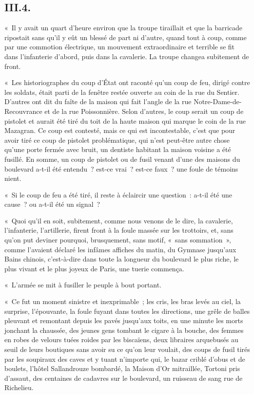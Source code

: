 \documentclass[french,twoside]{book} %
\begin{document}
\subsection[{III.4.}]{III.4.}
\noindent « Il y avait un quart d’heure environ que la troupe tiraillait et que la barricade ripostait sans qu’il y eût un blessé de part ni d’autre, quand tout à coup, comme par une commotion électrique, un mouvement extraordinaire et terrible se fit dans l’infanterie d’abord, puis dans la cavalerie. La troupe changea subitement de front.\par
« Les historiographes du coup d’État ont raconté qu’un coup de feu, dirigé contre les soldats, était parti de la fenêtre restée ouverte au coin de la rue du Sentier. D’autres ont dit du faîte de la maison qui fait l’angle de la rue Notre-Dame-de-Recouvrance et de la rue Poissonnière. Selon d’autres, le coup serait un coup de pistolet et aurait été tiré du toit de la haute maison qui marque le coin de la rue Mazagran. Ce coup est contesté, mais ce qui est incontestable, c’est que pour avoir tiré ce coup de pistolet problématique, qui n’est peut-être autre chose qu’une porte fermée avec bruit, un dentiste habitant la maison voisine a été fusillé. En somme, un coup de pistolet ou de fusil venant d’une des maisons du boulevard a-t-il été entendu ? est-ce vrai ? est-ce faux ? une foule de témoins nient.\par
« Si le coup de feu a été tiré, il reste à éclaircir une question : a-t-il été une cause ? ou a-t-il été un signal ?\par
« Quoi qu’il en soit, subitement, comme nous venons de le dire, la cavalerie, l’infanterie, l’artillerie, firent front à la foule massée sur les trottoirs, et, sans qu’on put deviner pourquoi, brusquement, sans motif, « sans sommation », comme l’avaient déclaré les infâmes affiches du matin, du Gymnase jusqu’aux Bains chinois, c’est-à-dire dans toute la longueur du boulevard le plus riche, le plus vivant et le plus joyeux de Paris, une tuerie commença.\par
« L’armée se mit à fusiller le peuple à bout portant.\par
« Ce fut un moment sinistre et inexprimable ; les cris, les bras levés au ciel, la surprise, l’épouvante, la foule fuyant dans toutes les directions, une grêle de balles pleuvant et remontant depuis les pavés jusqu’aux toits, en une minute les morts jonchant la chaussée, des jeunes gens tombant le cigare à la bouche, des femmes en robes de velours tuées roides par les biscaïens, deux libraires arquebusés au seuil de leurs boutiques sans avoir su ce qu’on leur voulait, des coups de fusil tirés par les soupiraux des caves et y tuant n’importe qui, le bazar criblé d’obus et de boulets, l’hôtel Sallandrouze bombardé, la Maison d’Or mitraillée, Tortoni pris d’assaut, des centaines de cadavres sur le boulevard, un ruisseau de sang rue de Richelieu.\par
\end{document}
